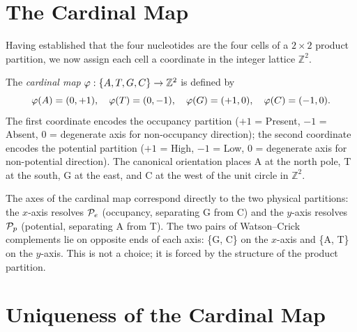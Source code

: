 \section{The Cardinal Map}
\label{sec:cardinal_map}

Having established that the four nucleotides are the four cells of a
$2\times 2$ product partition, we now assign each cell a coordinate in the
integer lattice $\mathbb{Z}^2$.

\begin{definition}
\label{def:cardinal_map}
The \emph{cardinal map} $\varphi: \{A,T,G,C\} \to \mathbb{Z}^2$ is
defined by
\begin{equation}
  \varphi(A) = (0,+1),\quad
  \varphi(T) = (0,-1),\quad
  \varphi(G) = (+1,0),\quad
  \varphi(C) = (-1,0).
  \label{eq:cardinal_assignments}
\end{equation}
The first coordinate encodes the occupancy partition ($+1$ = Present,
$-1$ = Absent, $0$ = degenerate axis for non-occupancy direction);
the second coordinate encodes the potential partition ($+1$ = High,
$-1$ = Low, $0$ = degenerate axis for non-potential direction). The
canonical orientation places A at the north pole, T at the south, G
at the east, and C at the west of the unit circle in $\mathbb{Z}^2$.
\end{definition}

\begin{remark}
The axes of the cardinal map correspond directly to the two physical
partitions: the $x$-axis resolves $\mathcal{P}_e$ (occupancy, separating G
from C) and the $y$-axis resolves $\mathcal{P}_p$ (potential, separating A
from T). The two pairs of Watson--Crick complements lie on opposite ends
of each axis: \{G, C\} on the $x$-axis and \{A, T\} on the $y$-axis.
This is not a choice; it is forced by the structure of the product partition.
\end{remark}

\section{Uniqueness of the Cardinal Map}
\label{sec:cardinal_uniqueness}

